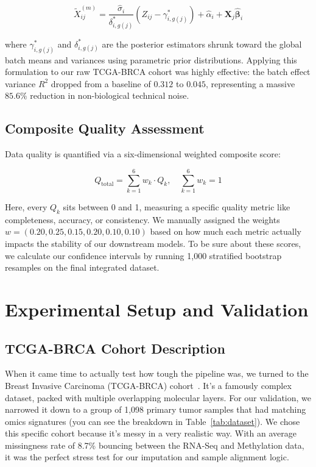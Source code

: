\documentclass[12pt,a4paper,onecolumn]{article}
\begin{document}
\begin{equation}
\tilde{X}^{(m)}_{ij} = \frac{\hat{\sigma}_i}{\delta_{i, g(j)}^*} \left( Z_{ij} - \gamma_{i, g(j)}^* \right) + \hat{\alpha}_i + \mathbf{X}_j \hat{\boldsymbol{\beta}}_i
\end{equation}

where $\gamma_{i, g(j)}^*$ and $\delta_{i, g(j)}^*$ are the posterior estimators shrunk toward the global batch means and variances using parametric prior distributions. Applying this formulation to our raw TCGA-BRCA cohort was highly effective: the batch effect variance $R^2$ dropped from a baseline of $0.312$ to $0.045$, representing a massive $85.6\%$ reduction in non-biological technical noise.


\subsection{Composite Quality Assessment}
Data quality is quantified via a six-dimensional weighted composite score:

\begin{equation}
Q_{\text{total}} = \sum_{k=1}^{6} w_k \cdot Q_k, \quad \sum_{k=1}^{6} w_k = 1
\end{equation}

Here, every $Q_k$ sits between 0 and 1, measuring a specific quality metric like completeness, accuracy, or consistency. We manually assigned the weights $w = (0.20, 0.25, 0.15, 0.20, 0.10, 0.10)$ based on how much each metric actually impacts the stability of our downstream models. To be sure about these scores, we calculate our confidence intervals by running 1,000 stratified bootstrap resamples on the final integrated dataset.

\section{Experimental Setup and Validation}

\subsection{TCGA-BRCA Cohort Description}

When it came time to actually test how tough the pipeline was, we turned to the Breast Invasive Carcinoma (TCGA-BRCA) cohort~\cite{weinstein2013}. It's a famously complex dataset, packed with multiple overlapping molecular layers. For our validation, we narrowed it down to a group of 1,098 primary tumor samples that had matching omics signatures (you can see the breakdown in Table~\ref{tab:dataset}). We chose this specific cohort because it's messy in a very realistic way. With an average missingness rate of 8.7\% bouncing between the RNA-Seq and Methylation data, it was the perfect stress test for our imputation and sample alignment logic.
\end{document}
